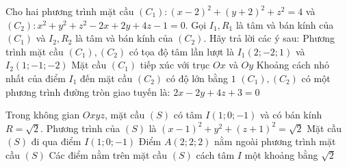 \begin{ex}%
	Cho hai phương trình mặt cầu $(C_1) \colon (x-2)^2+(y+2)^2+z^2=4$ và $(C_2) \colon x^2+y^2+z^2-2x+2y+4z-1=0$. Gọi $I_1, R_1$ là tâm và bán kính của $(C_1)$ và $I_2, R_2$ là tâm và bán kính của $(C_2)$. Hãy trả lời các ý sau:
	\choiceTF
	{Phương trình mặt cầu $(C_1), (C_2)$ có tọa độ tâm lần lượt là $I_1(2;-2;1)$ và $I_2(1;-1;-2)$}
	{\True Mặt cầu $(C_1)$ tiếp xúc với trục $Ox$ và $Oy$}
	{Khoảng cách nhỏ nhất của điểm $I_1$ đến mặt cầu $(C_2)$ có độ lớn bằng $1$}
	{\True $(C_1), (C_2)$ có một phương trình đường tròn giao tuyến là: $2x-2y+4z+3=0$}
\end{ex}

\begin{ex}%
	Trong không gian $Oxyz$, mặt cầu $(S)$ có tâm $I(1;0;-1)$ và có bán kính $R=\sqrt{2}$.
	\choiceTF
	{Phương trình của $(S)$ là $(x-1)^2+y^2+(z+1)^2=\sqrt{2}$}
	{Mặt cầu $(S)$ đi qua điểm  $I(1;0;-1)$}
	{\True Điểm $A(2;2;2)$ nằm ngoài phương trình mặt cầu $(S)$}
	{\True Các điểm nằm trên mặt cầu $(S)$ cách tâm $I$ một khoảng bằng $\sqrt{2}$}
\end{ex}

